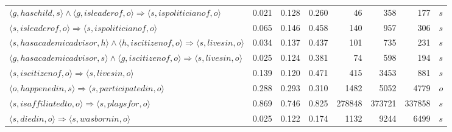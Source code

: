 \begin{tabular}{lrrrrrrl}
      $\langle g, haschild, s \rangle \wedge \langle g, isleaderof, o \rangle \Rightarrow \langle s, ispoliticianof , o \rangle$ &          0.021 &              0.128 &              0.260 &                              46 &                         358 &                             177 &        $s$ \\
                                            $\langle s, isleaderof, o \rangle \Rightarrow \langle s, ispoliticianof , o \rangle$ &          0.065 &              0.146 &              0.458 &                             140 &                         957 &                             306 &        $s$ \\
  $\langle s, hasacademicadvisor, h \rangle \wedge \langle h, iscitizenof, o \rangle \Rightarrow \langle s, livesin , o \rangle$ &          0.034 &              0.137 &              0.437 &                             101 &                         735 &                             231 &        $s$ \\
  $\langle g, hasacademicadvisor, s \rangle \wedge \langle g, iscitizenof, o \rangle \Rightarrow \langle s, livesin , o \rangle$ &          0.025 &              0.124 &              0.381 &                              74 &                         598 &                             194 &        $s$ \\
                                                  $\langle s, iscitizenof, o \rangle \Rightarrow \langle s, livesin , o \rangle$ &          0.139 &              0.120 &              0.471 &                             415 &                        3453 &                             881 &        $s$ \\
                                            $\langle o, happenedin, s \rangle \Rightarrow \langle s, participatedin , o \rangle$ &          0.288 &              0.293 &              0.310 &                            1482 &                        5052 &                            4779 &        $o$ \\
                                              $\langle s, isaffiliatedto, o \rangle \Rightarrow \langle s, playsfor , o \rangle$ &          0.869 &              0.746 &              0.825 &                          278848 &                      373721 &                          337858 &        $s$ \\
                                                     $\langle s, diedin, o \rangle \Rightarrow \langle s, wasbornin , o \rangle$ &          0.025 &              0.122 &              0.174 &                            1132 &                        9244 &                            6499 &        $s$ \\

\end{tabular}
